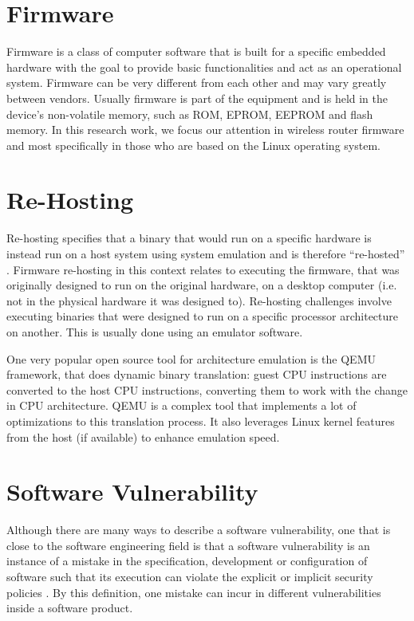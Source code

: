 \section{Firmware}

Firmware is a class of computer software that is built for a specific embedded hardware with the goal to provide basic functionalities and act as an operational system. Firmware can be very different from each other and may vary greatly between vendors. Usually firmware is part of the equipment and is held in the device's non-volatile memory, such as ROM, EPROM, EEPROM and flash memory. In this research work, we focus our attention in wireless router firmware and most specifically in those who are based on the Linux operating system.

\section{Re-Hosting}

Re-hosting specifies that a binary that would run on a specific hardware is instead run on a host system using system emulation and is therefore ``re-hosted'' \cite{firmware-challenges}. Firmware re-hosting in this context relates to executing the firmware, that was originally designed to run on the original hardware, on a desktop computer (i.e. not in the physical hardware it was designed to). Re-hosting challenges involve executing binaries that were designed to run on a specific processor architecture on another. This is usually done using an emulator software.

One very popular open source tool for architecture emulation is the QEMU framework, that does dynamic binary translation: guest CPU instructions are converted to the host CPU instructions, converting them to work with the change in CPU architecture. QEMU is a complex tool that implements a lot of optimizations to this translation process. It also leverages Linux kernel features from the host (if available) to enhance emulation speed.

\section{Software Vulnerability}

Although there are many ways to describe a software vulnerability, one that is close to the software engineering field is that a software vulnerability is an instance of a mistake in the specification, development or configuration of software such that its execution can violate the explicit or implicit security policies \cite{vuln-discovery}. By this definition, one mistake can incur in different vulnerabilities inside a software product.

